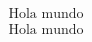 \documentclass{article}
\begin{document}
\begin{align*}
  \mbox{Hola mundo}\\
  \text{Hola mundo}\\
\end{align*}
\end{document}
